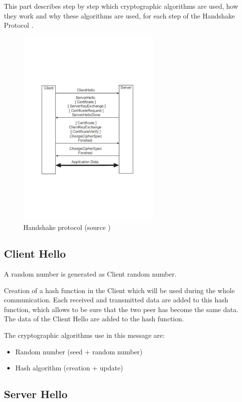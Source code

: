 This part describes step by step which cryptographic algorithms are used, how
they work and why these algorithms are used, for each step of the Handshake
Protocol \cite{RFC5246}.

\begin{figure}[!ht]
\centering
\includegraphics[trim=0cm 7cm 0cm 7cm,
height=10cm]{figures/tls_exg.pdf}
\caption{Handshake protocol (source \cite{book2})}
\label{fig:tls_exg}

\end{figure}

\subsection*{Client Hello}

A random number is generated as Client random number.

Creation of a hash function in the Client which will be used during the whole
communication.
Each received and transmitted data are added to this hash function, which allows
to be sure that the two peer has become the same data. The data of the Client
Hello are added to the hash function.

The cryptographic algorithms use in this message are:
\begin{itemize}[noitemsep]
  \item Random number (seed + random number)
  \item Hash algorithm (creation + update)
\end{itemize}


\subsection*{Server Hello}

